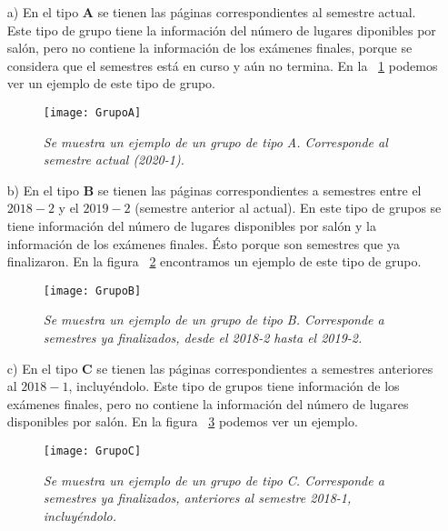   \begin{enumerate}
  \item[a)] En el tipo \textbf{A} se tienen las páginas correspondientes al semestre actual. Este tipo de grupo tiene la información del número de lugares diponibles por salón, pero no contiene la información de los exámenes finales, porque se considera que el semestres está en curso y aún no termina. En la \figurename{~\ref{GpoA}} podemos ver un ejemplo de este tipo de grupo.
  
  \begin{figure}[H]
  \centering
  \texttt{[image: GrupoA]} %
  \caption[\textit{Tipo de grupo A}]{\textit{Se muestra un ejemplo de un grupo de tipo A. Corresponde al semestre actual (2020-1).}}\label{GpoA}
  \end{figure}
  
  \item[b)] En el tipo \textbf{B} se tienen las páginas correspondientes a semestres entre el $2018-2$ y el $2019-2$ (semestre anterior al actual). En este tipo de grupos se tiene información del número de lugares disponibles por salón y la información de los exámenes finales. Ésto porque son semestres que ya finalizaron. En la figura \figurename{~\ref{GpoB}} encontramos un ejemplo de este tipo de grupo.
  
  \begin{figure}[H]
  \centering
  \texttt{[image: GrupoB]} %
  \caption[\textit{Tipo de grupo B}]{\textit{Se muestra un ejemplo de un grupo de tipo B. Corresponde a semestres ya finalizados, desde el 2018-2 hasta el 2019-2.}}\label{GpoB}
  \end{figure}
  
  \item[c)] En el tipo \textbf{C} se tienen las páginas correspondientes a semestres anteriores al $2018-1$, incluyéndolo. Este tipo de grupos tiene información de los exámenes finales, pero no contiene la información del número de lugares disponibles por salón. En la figura \figurename{~\ref{GpoC}} podemos ver un ejemplo.
  
  \begin{figure}[H]
  \centering
  \texttt{[image: GrupoC]} %
  \caption[\textit{Tipo de grupo C}]{\textit{Se muestra un ejemplo de un grupo de tipo C. Corresponde a semestres ya finalizados, anteriores al semestre 2018-1, incluyéndolo.}}\label{GpoC}
  \end{figure}
  \end{enumerate}
  
